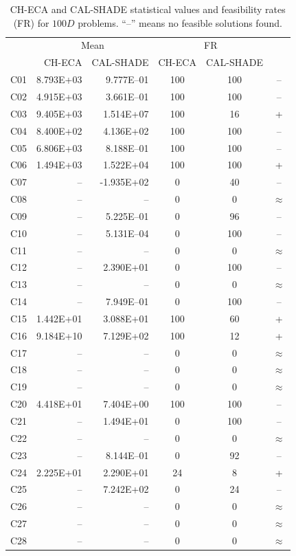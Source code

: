 \documentclass[conference]{IEEEtran}
\begin{document}
% 
% 
% 
\begin{table}[!]
	\caption{CH-ECA and CAL-SHADE statistical values and feasibility rates (FR) for $100D$ problems. ``--'' means no feasible solutions found.}
	\centering
	\begin{tabular}{|c|r|r|c|c|c|}
	 \hline
	 &\multicolumn{2}{|c|}{Mean} & \multicolumn{2}{|c|}{FR} & \\
	\cline{2-5}
	 & CH-ECA & CAL-SHADE & CH-ECA & CAL-SHADE & \\ \hline

C01 & 8.793E+03 & 9.777E--01 &  100 &  100 & -- \\ 
C02 & 4.915E+03 & 3.661E--01 &  100 &  100 & -- \\ 
C03 & 9.405E+03 & 1.514E+07 &  100 &   16 & + \\ 
C04 & 8.400E+02 & 4.136E+02 &  100 &  100 & -- \\ 
C05 & 6.806E+03 & 8.188E--01 &  100 &  100 & -- \\ 
C06 & 1.494E+03 & 1.522E+04 &  100 &  100 & + \\ 
C07 &  -- & -1.935E+02 &    0 &   40 & -- \\ 
C08 &  -- &  -- &    0 &    0 & $\approx$ \\ 
C09 &  -- & 5.225E--01 &    0 &   96 & -- \\ 
C10 &  -- & 5.131E--04 &    0 &  100 & -- \\ 
C11 &  -- &  -- &    0 &    0 & $\approx$ \\ 
C12 &  -- & 2.390E+01 &    0 &  100 & -- \\ 
C13 &  -- &  -- &    0 &    0 & $\approx$ \\ 
C14 &  -- & 7.949E--01 &    0 &  100 & -- \\ 
C15 & 1.442E+01 & 3.088E+01 &  100 &   60 & + \\ 
C16 & 9.184E+10 & 7.129E+02 &  100 &   12 & + \\ 
C17 &  -- &  -- &    0 &    0 & $\approx$ \\ 
C18 &  -- &  -- &    0 &    0 & $\approx$ \\ 
C19 &  -- &  -- &    0 &    0 & $\approx$ \\ 
C20 & 4.418E+01 & 7.404E+00 &  100 &  100 & -- \\ 
C21 &  -- & 1.494E+01 &    0 &  100 & -- \\ 
C22 &  -- &  -- &    0 &    0 & $\approx$ \\ 
C23 &  -- & 8.144E--01 &    0 &   92 & -- \\ 
C24 & 2.225E+01 & 2.290E+01 &   24 &    8 & + \\ 
C25 &  -- & 7.242E+02 &    0 &   24 & -- \\ 
C26 &  -- &  -- &    0 &    0 & $\approx$ \\ 
C27 &  -- &  -- &    0 &    0 & $\approx$ \\ 
C28 &  -- &  -- &    0 &    0 & $\approx$ \\ 
   \hline
	\end{tabular}
	\label{tab:d100c}
\end{table}
\end{document}

